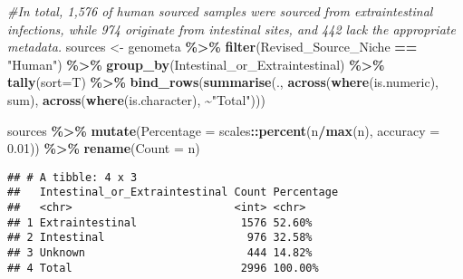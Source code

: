 \documentclass[
]{article}
\newenvironment{Shaded}{\begin{snugshade}}{\end{snugshade}}
\newcommand{\AttributeTok}[1]{\textcolor[rgb]{0.13,0.29,0.53}{#1}}
\newcommand{\CommentTok}[1]{\textcolor[rgb]{0.56,0.35,0.01}{\textit{#1}}}
\newcommand{\FloatTok}[1]{\textcolor[rgb]{0.00,0.00,0.81}{#1}}
\newcommand{\FunctionTok}[1]{\textcolor[rgb]{0.13,0.29,0.53}{\textbf{#1}}}
\newcommand{\NormalTok}[1]{#1}
\newcommand{\OtherTok}[1]{\textcolor[rgb]{0.56,0.35,0.01}{#1}}
\newcommand{\SpecialCharTok}[1]{\textcolor[rgb]{0.81,0.36,0.00}{\textbf{#1}}}
\newcommand{\StringTok}[1]{\textcolor[rgb]{0.31,0.60,0.02}{#1}}
\begin{document}
\begin{Shaded}
\begin{Highlighting}[]
\CommentTok{\#In total, 1,576 of human sourced samples were sourced from extraintestinal infections, while 974 originate from intestinal sites, and 442 lack the appropriate metadata.  }
\NormalTok{sources }\OtherTok{\textless{}{-}}\NormalTok{ genometa }\SpecialCharTok{\%\textgreater{}\%} \FunctionTok{filter}\NormalTok{(Revised\_Source\_Niche }\SpecialCharTok{==} \StringTok{"Human"}\NormalTok{) }\SpecialCharTok{\%\textgreater{}\%} \FunctionTok{group\_by}\NormalTok{(Intestinal\_or\_Extraintestinal) }\SpecialCharTok{\%\textgreater{}\%} \FunctionTok{tally}\NormalTok{(}\AttributeTok{sort=}\NormalTok{T)   }\SpecialCharTok{\%\textgreater{}\%} 
  \FunctionTok{bind\_rows}\NormalTok{(}\FunctionTok{summarise}\NormalTok{(.,}
                      \FunctionTok{across}\NormalTok{(}\FunctionTok{where}\NormalTok{(is.numeric), sum),}
                      \FunctionTok{across}\NormalTok{(}\FunctionTok{where}\NormalTok{(is.character), }\SpecialCharTok{\textasciitilde{}}\StringTok{"Total"}\NormalTok{)))}

\NormalTok{sources }\SpecialCharTok{\%\textgreater{}\%} \FunctionTok{mutate}\NormalTok{(}\AttributeTok{Percentage =}\NormalTok{ scales}\SpecialCharTok{::}\FunctionTok{percent}\NormalTok{(n}\SpecialCharTok{/}\FunctionTok{max}\NormalTok{(n), }\AttributeTok{accuracy =} \FloatTok{0.01}\NormalTok{)) }\SpecialCharTok{\%\textgreater{}\%} \FunctionTok{rename}\NormalTok{(}\StringTok{\textquotesingle{}Count\textquotesingle{}} \OtherTok{=}\NormalTok{ n)}
\end{Highlighting}
\end{Shaded}

\begin{verbatim}
## # A tibble: 4 x 3
##   Intestinal_or_Extraintestinal Count Percentage
##   <chr>                         <int> <chr>     
## 1 Extraintestinal                1576 52.60%    
## 2 Intestinal                      976 32.58%    
## 3 Unknown                         444 14.82%    
## 4 Total                          2996 100.00%
\end{verbatim}
\end{document}
